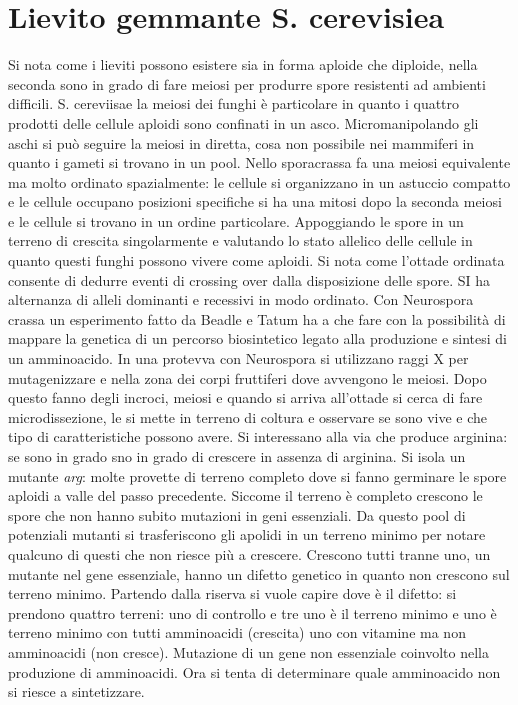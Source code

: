 \section{Lievito gemmante S. cerevisiea}
Si nota come i lieviti possono esistere sia in forma aploide che diploide, nella seconda sono in grado di fare meiosi per produrre spore resistenti ad ambienti difficili. S. 
cereviisae la meiosi dei funghi \`e particolare in quanto i quattro prodotti delle cellule aploidi sono confinati in un asco. Micromanipolando gli aschi si pu\`o seguire la meiosi
in diretta, cosa non possibile nei mammiferi in quanto i gameti si trovano in un pool. Nello sporacrassa fa una meiosi equivalente ma molto ordinato spazialmente: le cellule si 
organizzano in un astuccio compatto e le cellule occupano posizioni specifiche si ha una mitosi dopo la seconda meiosi e le cellule si trovano in un ordine particolare. Appoggiando 
le spore in un terreno di crescita singolarmente e valutando lo stato allelico delle cellule in quanto questi funghi possono vivere come aploidi. Si nota come l'ottade ordinata
consente di dedurre eventi di crossing over dalla disposizione delle spore. SI ha alternanza di alleli dominanti e recessivi in modo ordinato. Con Neurospora crassa un esperimento
fatto da Beadle e Tatum ha a che fare con la possibilit\`a di mappare la genetica di un percorso biosintetico legato alla produzione e sintesi di un amminoacido. In una protevva
con Neurospora si utilizzano raggi X per mutagenizzare e nella zona dei corpi fruttiferi dove avvengono le meiosi. Dopo questo fanno degli incroci, meiosi e quando si arriva 
all'ottade si cerca di fare microdissezione, le si mette in terreno di coltura e osservare se sono vive e che tipo di caratteristiche possono avere. Si interessano alla via che
produce arginina: se sono in grado sno in grado di crescere in assenza di arginina. Si isola un mutante \emph{arg}: molte provette di terreno completo dove si fanno germinare le
spore aploidi a valle del passo precedente. Siccome il terreno \`e completo crescono le spore che non hanno subito mutazioni in geni essenziali. Da questo pool di potenziali mutanti
si trasferiscono gli apolidi in un terreno minimo per notare qualcuno di questi che non riesce pi\`u a crescere. Crescono tutti tranne uno, un mutante nel gene essenziale, hanno un
difetto genetico in quanto non crescono sul terreno minimo. Partendo dalla riserva si vuole capire dove \`e il difetto: si prendono quattro terreni: uno di controllo e tre uno \`e
il terreno minimo  e uno \`e terreno minimo con tutti amminoacidi (crescita) uno con vitamine ma non amminoacidi (non cresce). Mutazione di un gene non essenziale coinvolto nella
produzione di amminoacidi. Ora si tenta di determinare quale amminoacido non si riesce a sintetizzare. 
